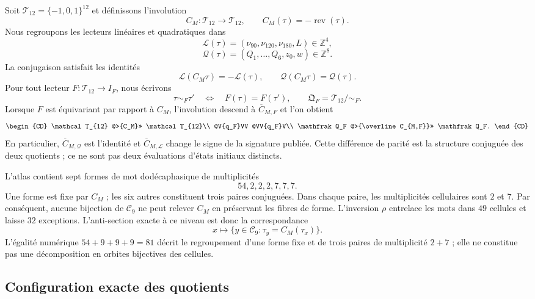 Soit \(\mathcal T_{12}=\{-1,0,1\}^{12}\) et définissons l'involution
\[
 C_M:\mathcal T_{12}\longrightarrow\mathcal T_{12},
 \qquad C_M(\tau)=-\operatorname{rev}(\tau).
\]
Nous regroupons les lecteurs linéaires et quadratiques dans
\[
 \mathcal L(\tau)=
 (\nu_{90},\nu_{120},\nu_{180},L)\in\mathbb Z^4,
\]
\[
 \mathcal Q(\tau)=
 (Q_1,\ldots,Q_6,z_0,w)\in\mathbb Z^8.
\]
La conjugaison satisfait les identités
\begin{equation}
 \mathcal L(C_M\tau)=-\mathcal L(\tau),
 \qquad
 \mathcal Q(C_M\tau)=\mathcal Q(\tau).
 \label{eq:paridad-conjugacion-rev11}
\end{equation}
Pour tout lecteur \(F:\mathcal T_{12}\to I_F\), nous écrivons
\[
 \tau\sim_F\tau'\quad\Longleftrightarrow\quad F(\tau)=F(\tau'),
 \qquad
 \mathfrak Q_F=\mathcal T_{12}/\!\sim_F.
\]
Lorsque \(F\) est équivariant par rapport à \(C_M\), l'involution descend à
\(\overline C_{M,F}\) et l'on obtient
\[
\begin{CD}
 \mathcal T_{12} @>{C_M}>> \mathcal T_{12}\\
 @V{q_F}VV @VV{q_F}V\\
 \mathfrak Q_F @>{\overline C_{M,F}}>> \mathfrak Q_F.
\end{CD}
\]
En particulier, \(\overline C_{M,\mathcal Q}\) est l'identité et
\(\overline C_{M,\mathcal L}\) change le signe de la signature publiée. Cette
différence de parité est la structure conjuguée des deux quotients ; ce ne
sont pas deux évaluations d'états initiaux distincts.

L'atlas contient sept formes de mot dodécaphasique de multiplicités
\begin{equation}
 54,2,2,2,7,7,7.
 \label{eq:multiplicidades-formas-rev11}
\end{equation}
Une forme est fixe par \(C_M\) ; les six autres constituent trois paires
conjuguées. Dans chaque paire, les multiplicités cellulaires sont \(2\) et \(7\).
Par conséquent, aucune bijection de \(\mathcal C_9\) ne peut relever
\(C_M\) en préservant les fibres de forme. L'inversion \(\rho\) entrelace les
mots dans \(49\) cellules et laisse \(32\) exceptions. L'anti-section exacte
à ce niveau est donc la correspondance
\[
 x\longmapsto
 \{y\in\mathcal C_9:\tau_y=C_M(\tau_x)\}.
\]
L'égalité numérique \(54+9+9+9=81\) décrit le regroupement d'une forme
fixe et de trois paires de multiplicité \(2+7\) ; elle ne constitue pas une
décomposition en orbites bijectives des cellules.

\subsection{Configuration exacte des quotients}

